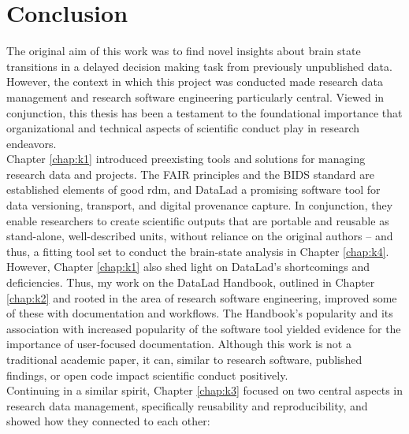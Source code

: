 

\chapter{Conclusion}
\label{discussion}

The original aim of this work was to find novel insights about brain state transitions in a delayed decision making task from previously unpublished data.
However, the context in which this project was conducted made research data management and research software engineering particularly central.
Viewed in conjunction, this thesis has been a testament to the foundational importance that organizational and technical aspects of scientific conduct play in research endeavors.\\
Chapter \ref{chap:k1} introduced preexisting tools and solutions for managing research data and projects.
The \gls{FAIR} principles and the \gls{BIDS} standard are established elements of good \gls{rdm}, and DataLad a promising software tool for data versioning, transport, and digital provenance capture.
In conjunction, they enable researchers to create scientific outputs that are portable and reusable as stand-alone, well-described units, without reliance on the original authors -- and thus, a fitting tool set to conduct the brain-state analysis in Chapter \ref{chap:k4}.\\
However, Chapter \ref{chap:k1} also shed light on DataLad's shortcomings and deficiencies.
Thus, my work on the DataLad Handbook, outlined in Chapter \ref{chap:k2} and rooted in the area of research software engineering, improved some of these with documentation and workflows.
The Handbook's popularity and its association with increased popularity of the software tool yielded evidence for the importance of user-focused documentation.
Although this work is not a traditional academic paper, it can, similar to research software, published findings, or open code impact scientific conduct positively.\\
Continuing in a similar spirit, Chapter \ref{chap:k3} focused on two central aspects in research data management, specifically reusability and reproducibility, and showed how they connected to each other:
